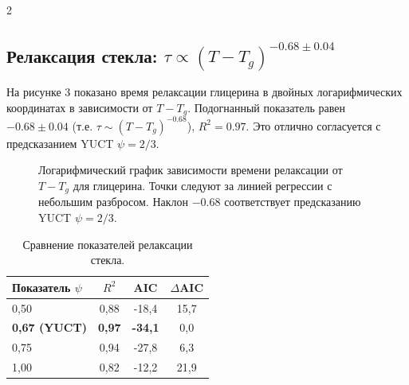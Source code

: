 \documentclass[11pt,a4paper]{article}
\begin{document}
\begin{multicols}{2}
		\subsection{Релаксация стекла: \(\tau \propto (T - T_g)^{-0.68 \pm 0.04}\)}
		
		На рисунке 3 показано время релаксации глицерина в двойных логарифмических координатах в зависимости от \(T - T_g\). Подогнанный показатель равен \(-0.68 \pm 0.04\) (т.е. \(\tau \sim (T - T_g)^{-0.68}\)), \(R^2 = 0.97\). Это отлично согласуется с предсказанием YUCT \(\psi = 2/3\).
		
		\begin{figure}[htbp]
			\centering
			\caption{Логарифмический график зависимости времени релаксации от \(T - T_g\) для глицерина. Точки следуют за линией регрессии с небольшим разбросом. Наклон \(-0.68\) соответствует предсказанию YUCT \(\psi = 2/3\).}
			\label{fig:glass}
		\end{figure}
		
		\begin{table}[htbp]
			\centering
			\caption{Сравнение показателей релаксации стекла.}
			\label{tab:glass}
			\begin{tabular}{lccc}
				\toprule
				Показатель $\psi$ & $R^2$ & AIC & $\Delta$AIC \\
				\midrule
				0,50 & 0,88 & -18,4 & 15,7 \\
				\textbf{0,67 (YUCT)} & \textbf{0,97} & \textbf{-34,1} & 0,0 \\
				0,75 & 0,94 & -27,8 & 6,3 \\
				1,00 & 0,82 & -12,2 & 21,9 \\
				\bottomrule
			\end{tabular}
		\end{table}
		

\end{multicols}
\end{document}
